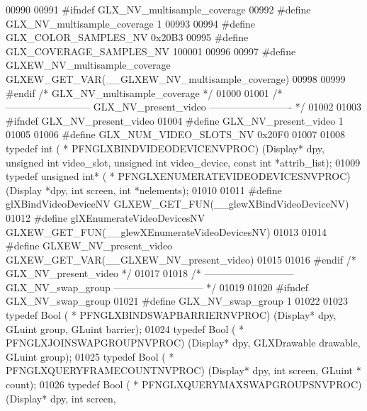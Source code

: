 \begin{DoxyCode}
00990 
00991 \textcolor{preprocessor}{#ifndef GLX\_NV\_multisample\_coverage}
00992 \textcolor{preprocessor}{#define GLX\_NV\_multisample\_coverage 1}
00993 
00994 \textcolor{preprocessor}{#define GLX\_COLOR\_SAMPLES\_NV 0x20B3}
00995 \textcolor{preprocessor}{#define GLX\_COVERAGE\_SAMPLES\_NV 100001}
00996 
00997 \textcolor{preprocessor}{#define GLXEW\_NV\_multisample\_coverage GLXEW\_GET\_VAR(\_\_GLXEW\_NV\_multisample\_coverage)}
00998 
00999 \textcolor{preprocessor}{#endif }\textcolor{comment}{/* GLX\_NV\_multisample\_coverage */}\textcolor{preprocessor}{}
01000 
01001 \textcolor{comment}{/* -------------------------- GLX\_NV\_present\_video ------------------------- */}
01002 
01003 \textcolor{preprocessor}{#ifndef GLX\_NV\_present\_video}
01004 \textcolor{preprocessor}{#define GLX\_NV\_present\_video 1}
01005 
01006 \textcolor{preprocessor}{#define GLX\_NUM\_VIDEO\_SLOTS\_NV 0x20F0}
01007 
01008 \textcolor{keyword}{typedef} int ( * PFNGLXBINDVIDEODEVICENVPROC) (Display* dpy, \textcolor{keywordtype}{unsigned} \textcolor{keywordtype}{int} video\_slot, \textcolor{keywordtype}{unsigned} \textcolor{keywordtype}{int} 
      video\_device, \textcolor{keyword}{const} \textcolor{keywordtype}{int} *attrib\_list);
01009 \textcolor{keyword}{typedef} \textcolor{keywordtype}{unsigned} \textcolor{keywordtype}{int}* ( * PFNGLXENUMERATEVIDEODEVICESNVPROC) (Display *dpy, \textcolor{keywordtype}{int} screen, \textcolor{keywordtype}{int} *nelements);
01010 
01011 \textcolor{preprocessor}{#define glXBindVideoDeviceNV GLXEW\_GET\_FUN(\_\_glewXBindVideoDeviceNV)}
01012 \textcolor{preprocessor}{#define glXEnumerateVideoDevicesNV GLXEW\_GET\_FUN(\_\_glewXEnumerateVideoDevicesNV)}
01013 
01014 \textcolor{preprocessor}{#define GLXEW\_NV\_present\_video GLXEW\_GET\_VAR(\_\_GLXEW\_NV\_present\_video)}
01015 
01016 \textcolor{preprocessor}{#endif }\textcolor{comment}{/* GLX\_NV\_present\_video */}\textcolor{preprocessor}{}
01017 
01018 \textcolor{comment}{/* --------------------------- GLX\_NV\_swap\_group --------------------------- */}
01019 
01020 \textcolor{preprocessor}{#ifndef GLX\_NV\_swap\_group}
01021 \textcolor{preprocessor}{#define GLX\_NV\_swap\_group 1}
01022 
01023 \textcolor{keyword}{typedef} Bool ( * PFNGLXBINDSWAPBARRIERNVPROC) (Display* dpy, GLuint group, 
      GLuint barrier);
01024 \textcolor{keyword}{typedef} Bool ( * PFNGLXJOINSWAPGROUPNVPROC) (Display* dpy, GLXDrawable drawable, 
      GLuint group);
01025 \textcolor{keyword}{typedef} Bool ( * PFNGLXQUERYFRAMECOUNTNVPROC) (Display* dpy, \textcolor{keywordtype}{int} screen, GLuint *
      count);
01026 \textcolor{keyword}{typedef} Bool ( * PFNGLXQUERYMAXSWAPGROUPSNVPROC) (Display* dpy, \textcolor{keywordtype}{int} screen, 

\end{DoxyCode}
